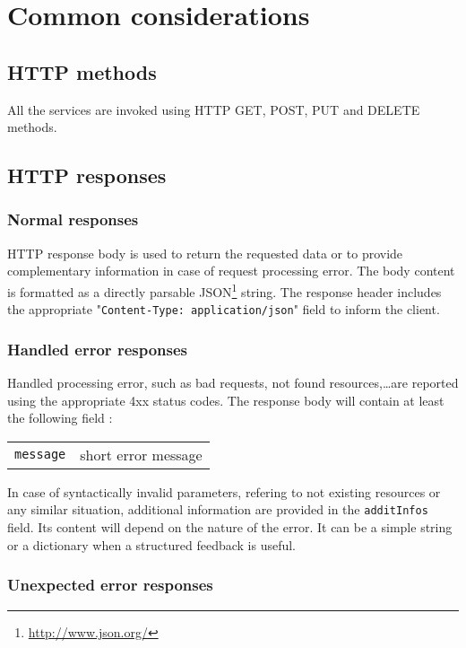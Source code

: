 \documentclass[11pt,a4paper]{article}
\begin{document}
\section{Common considerations} 

\subsection{HTTP methods}

All the services are invoked using HTTP GET, POST, PUT and DELETE methods. 

\subsection{HTTP responses}

\subsubsection{Normal responses}

HTTP response body is used to return the requested data or to provide complementary 
information in case of request processing error. The body content is formatted as a directly 
parsable JSON\footnote{\url{http://www.json.org/}} string. The response header includes the 
appropriate "\texttt{Content-Type: application/json}" field to inform the client.

\subsubsection{Handled error responses}

Handled processing error, such as bad requests, not found resources,\dots are reported using 
the appropriate 4xx status codes. The response body will contain at least the following 
field :

\begin{tabularx}{\textwidth}{lX}
\texttt{message} & short error message\\
\end{tabularx}

In case of syntactically invalid parameters, refering to not existing resources or 
any similar situation, additional information are provided in the \texttt{additInfos} field. 
Its content will depend on the nature of the error. It can be a simple string or a 
dictionary when a structured feedback is useful.

\subsubsection{Unexpected error responses}
\end{document}
